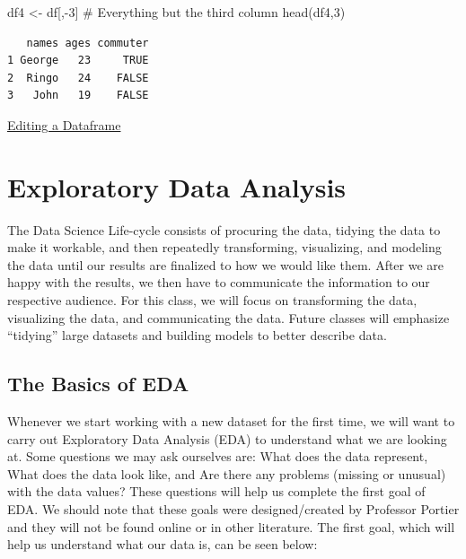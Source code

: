 \documentclass[
  letterpaper,
  DIV=11,
  numbers=noendperiod]{scrreprt}
\newenvironment{Shaded}{\begin{snugshade}}{\end{snugshade}}
\newcommand{\CommentTok}[1]{\textcolor[rgb]{0.37,0.37,0.37}{#1}}
\newcommand{\DecValTok}[1]{\textcolor[rgb]{0.68,0.00,0.00}{#1}}
\newcommand{\FunctionTok}[1]{\textcolor[rgb]{0.28,0.35,0.67}{#1}}
\newcommand{\NormalTok}[1]{\textcolor[rgb]{0.00,0.23,0.31}{#1}}
\newcommand{\OtherTok}[1]{\textcolor[rgb]{0.00,0.23,0.31}{#1}}
\newcommand{\SpecialCharTok}[1]{\textcolor[rgb]{0.37,0.37,0.37}{#1}}
\begin{document}
\begin{Shaded}
\begin{Highlighting}[]
\NormalTok{df4 }\OtherTok{\textless{}{-}}\NormalTok{ df[,}\SpecialCharTok{{-}}\DecValTok{3}\NormalTok{] }\CommentTok{\# Everything but the third column}
\FunctionTok{head}\NormalTok{(df4,}\DecValTok{3}\NormalTok{)}
\end{Highlighting}
\end{Shaded}

\begin{verbatim}
   names ages commuter
1 George   23     TRUE
2  Ringo   24    FALSE
3   John   19    FALSE
\end{verbatim}

\begin{watch}{}{}
    \href{https://youtu.be/us5M1ekgwUE}{Editing a Dataframe}
\end{watch}


\chapter{Exploratory Data Analysis}\label{exploratory-data-analysis}

The Data Science Life-cycle consists of procuring the data, tidying the
data to make it workable, and then repeatedly transforming, visualizing,
and modeling the data until our results are finalized to how we would
like them. After we are happy with the results, we then have to
communicate the information to our respective audience. For this class,
we will focus on transforming the data, visualizing the data, and
communicating the data. Future classes will emphasize ``tidying'' large
datasets and building models to better describe data.

\section{The Basics of EDA}\label{the-basics-of-eda}

Whenever we start working with a new dataset for the first time, we will
want to carry out Exploratory Data Analysis (EDA) to understand what we
are looking at. Some questions we may ask ourselves are: What does the
data represent, What does the data look like, and Are there any problems
(missing or unusual) with the data values? These questions will help us
complete the first goal of EDA. We should note that these goals were
designed/created by Professor Portier and they will not be found online
or in other literature. The first goal, which will help us understand
what our data is, can be seen below:
\end{document}
